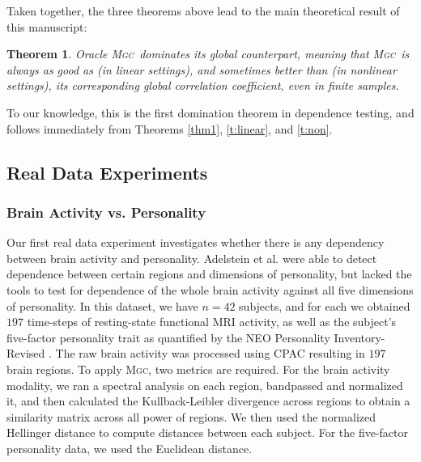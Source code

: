\documentclass[11pt]{article}
\providecommand{\sct}[1]{{\normalfont\textsc{#1}}}
\newcommand{\Mgc}{\sct{Mgc}}
\newtheorem{thm}{Theorem}
\begin{document}
Taken together, the three theorems above lead to the main theoretical result of this manuscript:
\begin{thm} \label{t:dominate}
Oracle \Mgc~dominates its global counterpart, meaning that \Mgc~is always as good as (in linear settings), and sometimes better than (in nonlinear settings), its corresponding global correlation coefficient, even in finite samples. 
\end{thm}

To our knowledge, this is the first domination theorem in dependence testing, and follows immediately from Theorems \ref{thm1}, \ref{t:linear}, and \ref{t:non}.


\subsection*{Real Data Experiments}
\label{numer3}

\subsubsection*{Brain Activity vs. Personality} %
Our first real data experiment investigates whether there is any dependency between  brain activity and personality.
Adelstein et al. \cite{AdelsteinEtAl2011} were able to detect dependence between certain regions and dimensions of personality, but lacked the tools to test for dependence of the whole brain activity against all five dimensions of personality. 
In this dataset, we have $n=42$ subjects, and for each we obtained  $197$ time-steps of resting-state functional MRI activity, as well as the subject's five-factor personality trait as quantified by  the NEO Personality Inventory-Revised  \cite{Costa1992}. 
The raw brain activity was processed using CPAC \cite{CPAC2015} resulting in $197$ brain regions.
To apply \Mgc, two metrics are required. For the brain activity modality, we ran a spectral analysis on each region, bandpassed and normalized it, and then calculated the Kullback-Leibler divergence across regions to obtain a similarity matrix across all power of regions.  We then used  the normalized Hellinger distance to compute distances between each subject. 
For the five-factor personality data, we  used the Euclidean distance.
\end{document}
